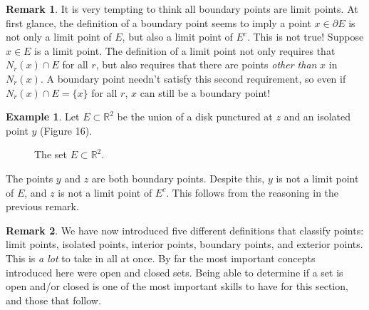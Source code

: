 \documentclass{article}
\newcommand{\R}{\mathbb{R}}
\theoremstyle{definition}
\newtheorem{example}{Example}[section]
\newtheorem{remark}{Remark}[section]
\begin{document}
\begin{remark}
	It is very tempting to think all boundary points are limit points. At first glance, the definition of a boundary point seems to imply a point $ x\in\partial E $ is not only a limit point of $ E $, but also a limit point of $ E^c $. This is not true! Suppose $ x\in E $ is a limit point. The definition of a limit point not only requires that $ N_r(x)\cap E $ for all $ r $, but also requires that there are points \textit{other than} $ x $ in $ N_r(x) $. A boundary point needn't satisfy this second requirement, so even if $ N_r(x)\cap E=\{x\} $ for all $ r $, $ x $ can still be a boundary point! 
\end{remark}

\begin{example}
	Let $ E\subset \R^2 $ be the union of a disk punctured at $ z $ and an isolated point $ y $ (Figure 16).  
	\begin{figure}[h]
		\centering
		\caption{The set $ E\subset \R^2 $.}
	\end{figure}

The points $ y $ and $ z $ are both boundary points. Despite this, $ y $ is not a limit point of $ E $, and $ z $ is not a limit point of $ E^c $. This follows from the reasoning in the previous remark.  	
\end{example}

\begin{remark}
	We have now introduced five different definitions that classify points: limit points, isolated points, interior points, boundary points, and exterior points. This is \textit{a lot} to take in all at once. By far the most important concepts introduced here were open and closed sets. Being able to determine if a set is open and/or closed is one of the most important skills to have for this section, and those that follow. 
\end{remark}
\end{document}
